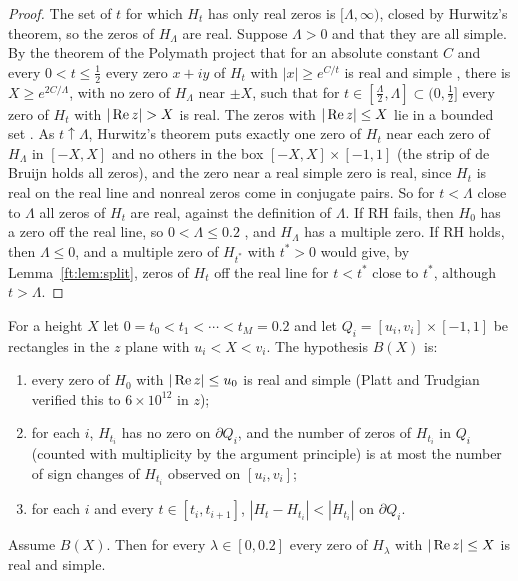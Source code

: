 \begin{proof}
The set of $t$ for which $H_t$ has only real zeros is $[\Lambda,\infty)$, closed by Hurwitz's theorem, so the zeros of $H_\Lambda$ are real. Suppose $\Lambda>0$ and that they are all simple. By the theorem of the Polymath project that for an absolute constant $C$ and every $0<t\le\frac12$ every zero $x+iy$ of $H_t$ with $|x|\ge e^{C/t}$ is real and simple \cite[Theorem~1.5]{Polymath}, there is $X\ge e^{2C/\Lambda}$, with no zero of $H_\Lambda$ near $\pm X$, such that for $t\in[\frac\Lambda2,\Lambda]\subset(0,\frac12]$ every zero of $H_t$ with $|\re z|>X$ is real. The zeros with $|\operatorname{Re} z|\le X$ lie in a bounded set \cite{deBruijn}. As $t\uparrow\Lambda$, Hurwitz's theorem puts exactly one zero of $H_t$ near each zero of $H_\Lambda$ in $[-X,X]$ and no others in the box $[-X,X]\times[-1,1]$ (the strip of de Bruijn holds all zeros), and the zero near a real simple zero is real, since $H_t$ is real on the real line and nonreal zeros come in conjugate pairs. So for $t<\Lambda$ close to $\Lambda$ all zeros of $H_t$ are real, against the definition of $\Lambda$. If RH fails, then $H_0$ has a zero off the real line, so $0<\Lambda\le0.2$ \cite{PT21}, and $H_\Lambda$ has a multiple zero. If RH holds, then $\Lambda\le0$, and a multiple zero of $H_{t^*}$ with $t^*>0$ would give, by Lemma~\ref{ft:lem:split}, zeros of $H_t$ off the real line for $t<t^*$ close to $t^*$, although $t>\Lambda$.
\end{proof}

For a height $X$ let $0=t_0<t_1<\cdots<t_M=0.2$ and let $Q_i=[u_i,v_i]\times[-1,1]$ be rectangles in the $z$ plane with $u_i<X<v_i$. The hypothesis $B(X)$ is:
\begin{enumerate}
\item[(B0)] every zero of $H_0$ with $|\operatorname{Re} z|\le u_0$ is real and simple (Platt and Trudgian \cite{PT21} verified this to $6\times10^{12}$ in $z$);
\item[(B1)] for each $i$, $H_{t_i}$ has no zero on $\partial Q_i$, and the number of zeros of $H_{t_i}$ in $Q_i$ (counted with multiplicity by the argument principle) is at most the number of sign changes of $H_{t_i}$ observed on $[u_i,v_i]$;
\item[(B2)] for each $i$ and every $t\in[t_i,t_{i+1}]$, $|H_t-H_{t_i}|<|H_{t_i}|$ on $\partial Q_i$.
\end{enumerate}

\begin{proposition}\label{ft:prop:below}
Assume $B(X)$. Then for every $\lambda\in[0,0.2]$ every zero of $H_\lambda$ with $|\operatorname{Re} z|\le X$ is real and simple.
\end{proposition}

